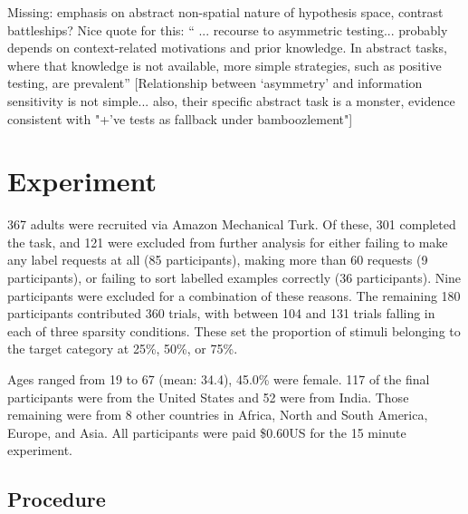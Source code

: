 \documentclass[10pt,letterpaper]{article}
\begin{document}
Missing: emphasis on abstract non-spatial nature of hypothesis space, contrast battleships?
Nice quote for this: `` ... recourse to asymmetric testing... probably depends on context-related motivations and prior knowledge. In abstract tasks, where that knowledge is not available, more simple strategies, such as positive testing, are prevalent''\cite{cherubini2010questionasymmetry}
[Relationship between `asymmetry' and information sensitivity is not simple... also, their specific abstract task is a monster, evidence consistent with "+'ve tests as fallback under bamboozlement"]

\section*{Experiment}
367 adults were recruited via Amazon Mechanical Turk.%
Of these, 301 completed the task, and 121 were excluded from further analysis for either failing to make any label requests at all (85 participants), making more than 60 requests (9 participants), or failing to sort labelled examples correctly (36 participants). Nine participants were excluded for a combination of these reasons.%
The remaining 180 participants contributed 360 trials, with between 104 and 131 trials falling in each of three sparsity conditions. These set the proportion of stimuli belonging to the target category at 25\%, 50\%, or 75\%.

Ages ranged from 19 to 67 (mean: 34.4), 45.0\% were female. 117 of the final participants were from the United States and 52 were from India. Those remaining were from 8 other countries in Africa, North and South America, Europe, and Asia. All participants were paid \$0.60US for the 15 minute experiment.

\subsection{Procedure}
\end{document}
